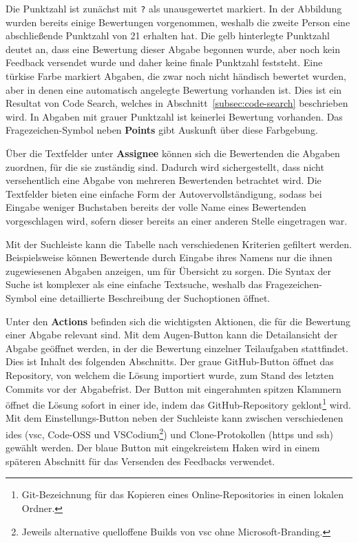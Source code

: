 Die Punktzahl ist zunächst mit \texttt{?} als unausgewertet markiert.
In der Abbildung wurden bereits einige Bewertungen vorgenommen, weshalb die zweite Person eine abschließende Punktzahl von 21 erhalten hat.
Die gelb hinterlegte Punktzahl deutet an, dass eine Bewertung dieser Abgabe begonnen wurde, aber noch kein Feedback versendet wurde und daher keine finale Punktzahl feststeht.
Eine türkise Farbe markiert Abgaben, die zwar noch nicht händisch bewertet wurden, aber in denen eine automatisch angelegte Bewertung vorhanden ist.
Dies ist ein Resultat von Code Search, welches in Abschnitt~\ref{subsec:code-search} beschrieben wird.
In Abgaben mit grauer Punktzahl ist keinerlei Bewertung vorhanden.
Das Fragezeichen-Symbol neben \textbf{Points} gibt Auskunft über diese Farbgebung.

Über die Textfelder unter \textbf{Assignee} können sich die Bewertenden die Abgaben zuordnen, für die sie zuständig sind.
Dadurch wird sichergestellt, dass nicht versehentlich eine Abgabe von mehreren Bewertenden betrachtet wird.
Die Textfelder bieten eine einfache Form der Autovervollständigung, sodass bei Eingabe weniger Buchstaben bereits der volle Name eines Bewertenden vorgeschlagen wird, sofern dieser bereits an einer anderen Stelle eingetragen war.

Mit der Suchleiste kann die Tabelle nach verschiedenen Kriterien gefiltert werden.
Beispielsweise können Bewertende durch Eingabe ihres Namens nur die ihnen zugewiesenen Abgaben anzeigen, um für Übersicht zu sorgen.
Die Syntax der Suche ist komplexer als eine einfache Textsuche, weshalb das Fragezeichen-Symbol eine detaillierte Beschreibung der Suchoptionen öffnet.

Unter den \textbf{Actions} befinden sich die wichtigsten Aktionen, die für die Bewertung einer Abgabe relevant sind.
Mit dem Augen-Button kann die Detailansicht der Abgabe geöffnet werden, in der die Bewertung einzelner Teilaufgaben stattfindet.
Dies ist Inhalt des folgenden Abschnitts.
Der graue GitHub-Button öffnet das Repository, von welchem die Lösung importiert wurde, zum Stand des letzten Commits vor der Abgabefrist.
Der Button mit eingerahmten spitzen Klammern öffnet die Lösung sofort in einer \ac{ide}, indem das GitHub-Repository geklont\footnote{
    Git-Bezeichnung für das Kopieren eines Online-Repositories in einen lokalen Ordner.
} wird.
Mit dem Einstellungs-Button neben der Suchleiste kann zwischen verschiedenen \acp{ide} (\ac{vsc}, Code-OSS und VSCodium\footnote{
    Jeweils alternative quelloffene Builds von \ac{vsc} ohne Microsoft-Branding.
}) und Clone-Protokollen (\acs{https} und \acs{ssh}) gewählt werden.
Der blaue Button mit eingekreistem Haken wird in einem späteren Abschnitt für das Versenden des Feedbacks verwendet.

